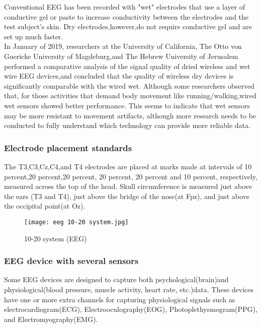 \documentclass[12pt,a4paper]{article}
\begin{document}
Conventional EEG has been recorded with "wet" electrodes that use a layer of conductive gel or paste to increase conductivity between the electrodes and the test subject's skin. Dry electrodes,however,do not require conductive gel and are set up much faster.\\In January of 2019, researchers at the University of California, The Otto von Guericke University of Magdeburg,and The Hebrew University of Jerusalem performed a comparative analysis of the signal quality of dried wireless and wet wire EEG devices,and concluded that the quality of wireless dry devices is significantly comparable with the wired wet. Although some researchers observed that, for those activities that demand body movement like running/walking,wired wet sensors showed better performance. This seems to indicate that wet sensors may be more resistant to movement artifacts, although more research needs to be conducted to fully understand which technology can provide more reliable data.



\subsubsection{Electrode placement standards}

The T3,C3,Cz,C4,and T4 electrodes are placed at marks made at intervals of 10 percent,20 percent,20 percent, 20 percent, 20 percent and 10 percent, respectively, measured  across the top of the head. Skull circumference is measured just above the ears (T3 and T4), just above the bridge of the nose(at Fpz), and just above the occipital point(at Oz).

\begin{figure}[h]
\centering
\texttt{[image: eeg 10-20 system.jpg]}
\caption{10-20 system (EEG)}
\end{figure}

\subsubsection{EEG device with several sensors}

Some EEG devices are designed to capture both psychological(brain)and physiological(blood pressure, muscle activity, heart rate, etc.)data. These devices have one or more extra channels for capturing physiological signals such as electrocardiogram(ECG), Electrooculography(EOG), Photoplethysmogram(PPG), and Electromyography(EMG).\\
\end{document}
